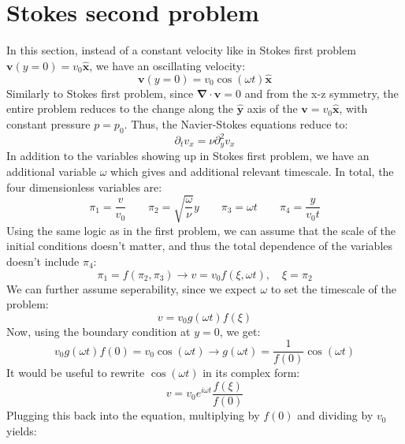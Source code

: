\documentclass{article}
\begin{document}
\newpage
\section{Stokes second problem}
In this section, instead of a constant velocity like in Stokes first problem $\boldsymbol{v}(y = 0) = v_0 \boldsymbol{\hat{x}}$, we have an oscillating velocity:
\begin{equation}
    \boldsymbol{v}(y = 0) = v_0 \cos(\omega t) \boldsymbol{\hat{x}}
\end{equation}
Similarly to Stokes first problem, since $\boldsymbol{\nabla}\cdot\boldsymbol{v} = 0$ and from the x-z symmetry, the entire problem reduces to the change along the $\boldsymbol{\hat{y}}$ axis of the $\boldsymbol{v} = v_0\boldsymbol{\hat{x}}$, with constant pressure $p = p_0$. Thus, the Navier-Stokes equations reduce to:
\begin{equation}
    \partial_t v_x = \nu \partial_y^2 v_x
\end{equation}
In addition to the variables showing up in Stokes first problem, we have an additional variable $\omega$ which gives and additional relevant timescale. In total, the four dimensionless variables are:
\begin{equation}
    \pi_1 = \frac{v}{v_0}
    \qquad
    \pi_2 = \sqrt{\frac{\omega}{\nu}}y
    \qquad
    \pi_3 = \omega t
    \qquad
    \pi_4 = \frac{y}{v_0 t}
\end{equation}
Using the same logic as in the first problem, we can assume that the scale of the initial conditions doesn't matter, and thus the total dependence of the variables doesn't include $\pi_4$:
\begin{equation}
    \pi_1 = f(\pi_2, \pi_3) \rightarrow v = v_0 f(\xi, \omega t), \quad \xi = \pi_2
\end{equation}
We can further assume seperability, since we expect $\omega$ to set the timescale of the problem:
\begin{equation}
    v = v_0 g(\omega t) f(\xi)
\end{equation}
Now, using the boundary condition at $y = 0$, we get:
\begin{equation}
    v_0 g(\omega t) f(0) = v_0 \cos(\omega t) \rightarrow g(\omega t) = \frac{1}{f(0)}\cos(\omega t)
\end{equation}
It would be useful to rewrite $\cos(\omega t)$ in its complex form:
\begin{equation}
    v = v_0 e^{i \omega t} \frac{f(\xi)}{f(0)}
\end{equation}
Plugging this back into the equation, multiplying by $f(0)$ and dividing by $v_0$ yields:
\end{document}

